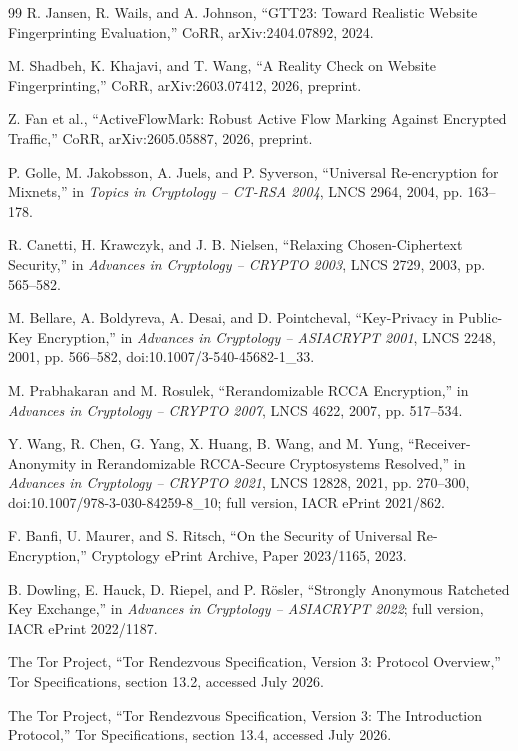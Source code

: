 \documentclass[11pt,oneside]{article}
\begin{document}
\begin{thebibliography}{99}
R. Jansen, R. Wails, and A. Johnson,
``GTT23: Toward Realistic Website Fingerprinting Evaluation,''
CoRR, arXiv:2404.07892, 2024.

M. Shadbeh, K. Khajavi, and T. Wang,
``A Reality Check on Website Fingerprinting,''
CoRR, arXiv:2603.07412, 2026, preprint.

Z. Fan et al.,
``ActiveFlowMark: Robust Active Flow Marking Against Encrypted Traffic,''
CoRR, arXiv:2605.05887, 2026, preprint.

P. Golle, M. Jakobsson, A. Juels, and P. Syverson,
``Universal Re-encryption for Mixnets,''
in \emph{Topics in Cryptology -- CT-RSA 2004}, LNCS 2964, 2004, pp. 163--178.

R. Canetti, H. Krawczyk, and J. B. Nielsen,
``Relaxing Chosen-Ciphertext Security,''
in \emph{Advances in Cryptology -- CRYPTO 2003}, LNCS 2729, 2003, pp. 565--582.

M. Bellare, A. Boldyreva, A. Desai, and D. Pointcheval,
``Key-Privacy in Public-Key Encryption,''
in \emph{Advances in Cryptology -- ASIACRYPT 2001}, LNCS 2248, 2001, pp. 566--582,
doi:10.1007/3-540-45682-1\_33.

M. Prabhakaran and M. Rosulek,
``Rerandomizable RCCA Encryption,''
in \emph{Advances in Cryptology -- CRYPTO 2007}, LNCS 4622, 2007, pp. 517--534.

Y. Wang, R. Chen, G. Yang, X. Huang, B. Wang, and M. Yung,
``Receiver-Anonymity in Rerandomizable RCCA-Secure Cryptosystems Resolved,''
in \emph{Advances in Cryptology -- CRYPTO 2021}, LNCS 12828, 2021, pp. 270--300,
doi:10.1007/978-3-030-84259-8\_10; full version, IACR ePrint 2021/862.

F. Banfi, U. Maurer, and S. Ritsch,
``On the Security of Universal Re-Encryption,''
Cryptology ePrint Archive, Paper 2023/1165, 2023.

B. Dowling, E. Hauck, D. Riepel, and P. R\"osler,
``Strongly Anonymous Ratcheted Key Exchange,''
in \emph{Advances in Cryptology -- ASIACRYPT 2022}; full version, IACR ePrint 2022/1187.

The Tor Project,
``Tor Rendezvous Specification, Version 3: Protocol Overview,''
Tor Specifications, section 13.2, accessed July 2026.

The Tor Project,
``Tor Rendezvous Specification, Version 3: The Introduction Protocol,''
Tor Specifications, section 13.4, accessed July 2026.


\end{thebibliography}
\end{document}
